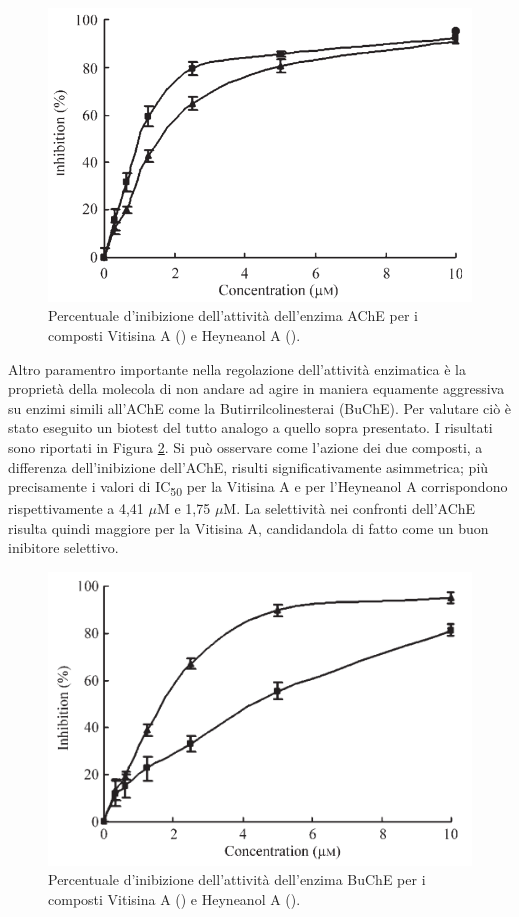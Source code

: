 \documentclass[a4paper, 12pt]{article}
\begin{document}
\begin{figure}[H]
	\centering
	\includegraphics[width=.9\linewidth]{immagini/risache_resveratrolo.png}
	\caption{Percentuale d'inibizione dell'attività dell'enzima AChE per i composti Vitisina A () e Heyneanol A (). }
	\label{fig:risache_resveratrolo}
\end{figure}

Altro paramentro importante nella regolazione dell'attività enzimatica è la proprietà della molecola di non andare ad agire in maniera equamente aggressiva su enzimi simili all'AChE come la Butirrilcolinesterai (BuChE). Per valutare ciò è stato eseguito un biotest del tutto analogo a quello sopra presentato. I risultati sono riportati in Figura \ref{fig:risbuche_resveratrolo}. Si può osservare come l'azione dei due composti, a differenza dell'inibizione dell'AChE, risulti significativamente asimmetrica; più precisamente i valori di IC\textsubscript{50} per la Vitisina A e per l'Heyneanol A corrispondono rispettivamente a 4,41 $\mu$M e 1,75 $\mu$M. La selettività nei confronti dell'AChE risulta quindi maggiore per la Vitisina A, candidandola di fatto come un buon inibitore selettivo. \cite{jang_inhibition_2008}

\begin{figure}[H]
	\centering
	\includegraphics[width=.9\linewidth]{immagini/risbuche_resveratrolo.png}
	\caption{Percentuale d'inibizione dell'attività dell'enzima BuChE per i composti Vitisina A () e Heyneanol A (). }
	\label{fig:risbuche_resveratrolo}
\end{figure}
\end{document}
